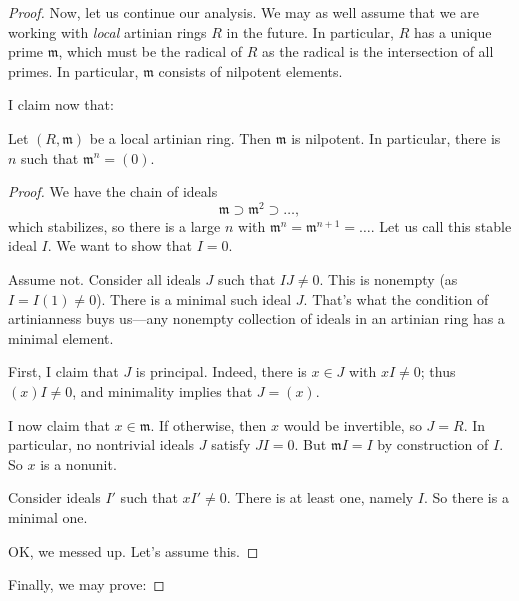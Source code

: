 \begin{proof}
Now, let us continue our analysis. We may as well assume that we are working
with \emph{local} artinian rings $R$ in the future. In particular, $R$ has a unique
prime $\mathfrak{m}$, which must be the radical of $R$ as the radical is the
intersection of all primes. In particular, $\mathfrak{m}$ consists of
nilpotent elements.

I claim now that:
\begin{lemma} Let $(R, \mathfrak{m})$ be a local artinian ring.
Then $\mathfrak{m}$ is nilpotent. In particular, there is $n$ such that
$\mathfrak{m}^n = (0)$.
\end{lemma}
\begin{proof}
We have the chain of ideals 
\[ \mathfrak{m} \supset \mathfrak{m}^2 \supset \dots,  \]
which stabilizes, so there is a large $n$ with $\mathfrak{m}^n =
\mathfrak{m}^{n+1} = \dots$. Let us call this stable ideal $I$. We want to show
that $I = 0$. 

Assume not. Consider all ideals $J$ such that $IJ \neq 0$. This is nonempty (as
$I = I(1) \neq 0$). There is a minimal such ideal $J$. That's what the
condition of artinianness buys us---any nonempty collection of ideals in an
artinian ring has a minimal element.

First, I claim that $J$ is principal. Indeed, there is $x \in J$ with $x I \neq
0$; thus $(x)I \neq 0$, and minimality implies that $J = (x)$. 


I now claim that $x \in \mathfrak{m}$. If otherwise, then $x$ would be
invertible, so $J = R$. In particular, no nontrivial ideals $J$ satisfy $JI =
0$. But $\mathfrak{m}I = I$ by construction of $I$. So $x$ is a nonunit.

Consider ideals $I'$ such that $xI' \neq 0$. There is at least one, namely $I$. 
So there is a minimal one. 


OK, we messed up. Let's assume this.
\end{proof}

Finally, we may prove:


\end{proof}
